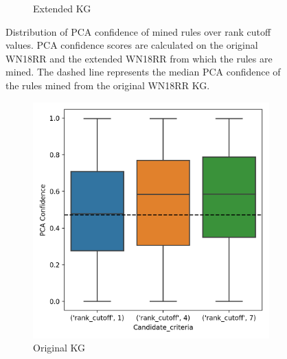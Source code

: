 \begin{figure}[htb]
\begin{subfigure}{.5\textwidth}
  \caption{Extended KG}
  \label{fig:_PCA_rank_wn18rr_boxplot_sub}
\end{subfigure}
\caption[Dist. of PCA conf. of rules over rank cutoff values - WN18RR KG.]{Distribution of PCA confidence of mined rules over rank cutoff values. PCA confidence scores are calculated on the original WN18RR and the extended WN18RR from which the rules are mined. The dashed line represents the median PCA confidence of the rules mined from the original WN18RR KG.}
\label{fig:PCA_rank_wn18rr_boxplot}
\end{figure}

\begin{figure}[htb]
\centering
\begin{subfigure}{.5\textwidth}
  \centering
  \includegraphics[width=1\linewidth]{figures/results/ranks/PCA-rank_family.png}
  \caption{Original KG}
  \label{fig:models_rank_boxplot_sub}
\end{subfigure}%
\begin{subfigure}{.5\textwidth}
  \centering

\end{subfigure}
\end{figure}
